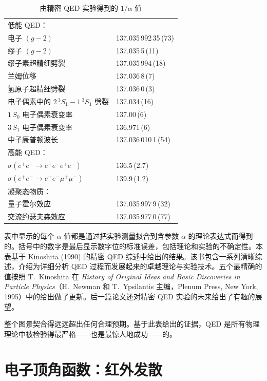 \begin{table}[t]
  \centering
  \caption{由精密 QED 实验得到的 $1/\alpha$ 值}
  \begin{tabular}{ll}
    \toprule
    低能 QED： & \\
    电子 $(g-2)$ & 137.035\,992\,35\,(73)\\
    缪子 $(g-2)$ & 137.035\,5\,(11)\\
    缪子素超精细劈裂 & 137.035\,994\,(18)\\
    兰姆位移 & 137.036\,8\,(7)\\
    氢原子超精细劈裂 & 137.036\,0\,(3)\\
    电子偶素中的 $2\,^3S_1 - 1\,^3S_1$ 劈裂 & 137.034\,(16)\\
    $1\,S_0$ 电子偶素衰变率 & 137.00\,(6)\\
    $3\,S_1$ 电子偶素衰变率 & 136.971\,(6)\\
    中子康普顿波长 & 137.036\,010\,1\,(54)\\
    \midrule
    高能 QED： & \\
    $\sigma(e^{+}e^{-}\to e^{+}e^{-}e^{+}e^{-})$ & 136.5\,(2.7)\\
    $\sigma(e^{+}e^{-}\to e^{+}e^{-}\mu^{+}\mu^{-})$ & 139.9\,(1.2)\\
    \midrule
    凝聚态物质： & \\
    量子霍尔效应 & 137.035\,997\,9\,(32)\\
    交流约瑟夫森效应 & 137.035\,977\,0\,(77)\\
    \bottomrule
  \end{tabular}
  \label{tab:6.1}
\end{table}

表中显示的每个 $\alpha$ 值都是通过把实验测量拟合到含参数 $\alpha$ 的理论表达式而得到的。括号中的数字是最后显示数字位的标准误差，包括理论和实验的不确定性。本表基于 Kinoshita (1990) 的精密 QED 综述中给出的结果。该书包含一系列清晰综述，介绍为详细分析 QED 过程而发展起来的卓越理论与实验技术。五个最精确的值按照 T.~Kinoshita 在 \emph{History of Original Ideas and Basic Discoveries in Particle Physics}（H.~Newman 和 T.~Ypsilantis 主编，Plenum Press, New York, 1995）中的给出做了更新。后一篇论文还对精密 QED 实验的未来给出了有趣的展望。

整个图景契合得远远超出任何合理预期。基于此表给出的证据，QED 是所有物理理论中被检验得最严格——也是最惊人地成功——的。

\section{电子顶角函数：红外发散}

